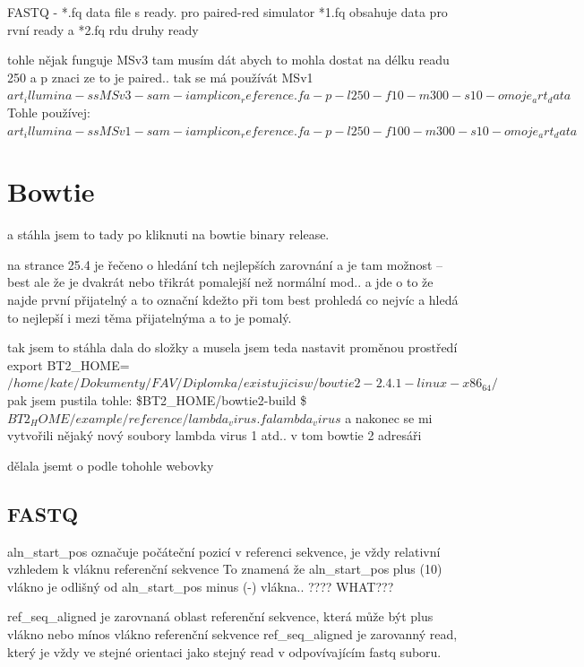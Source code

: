 \documentclass[czech,DP]{thesiskiv}
\numberwithin{equation}{section}
\begin{document}
FASTQ - *.fq data file s ready. pro paired-red simulator
*1.fq obsahuje data pro rvní ready a *2.fq rdu druhy ready

tohle nějak funguje
MSv3 tam musím dát abych to mohla dostat na délku readu 250 a p znaci ze to je paired.. 
tak se má používát MSv1
$art_illumina -ss MSv3 -sam -i amplicon_reference.fa -p -l 250 -f 10 -m 300 -s 10 -o moje_art_data$
Tohle používej:
$art_illumina -ss MSv1 -sam -i amplicon_reference.fa -p -l 250 -f 100 -m 300 -s 10 -o moje_art_data$


\section{Bowtie}
 a stáhla jsem to tady %
 po kliknuti na bowtie binary release.

na strance 25.4 je řečeno o hledání tch nejlepších zarovnání a je tam možnost --best ale že je dvakrát nebo třikrát pomalejší než normální mod.. a jde o to že najde první přijatelný a to označní kdežto při tom best prohledá co nejvíc a hledá to nejlepší i mezi těma přijatelnýma a to je pomalý.


tak jsem  to stáhla dala do složky a musela jsem teda nastavit proměnou prostředí 
export BT2\_HOME=$/home/kate/Dokumenty/FAV/Diplomka/existujicisw/bowtie2-2.4.1-linux-x86_64/$
pak jsem pustila tohle: 
\$BT2\_HOME/bowtie2-build \$ $BT2_HOME/example/reference/lambda_virus.fa lambda_virus$
a nakonec se mi vytvořili nějaký nový soubory lambda virus 1 atd.. v tom bowtie 2 adresáři

dělala jsemt o podle tohohle webovky %

\subsection{FASTQ}

	    
	    aln\_start\_pos označuje počáteční pozicí v referenci sekvence, je vždy relativní vzhledem k vláknu referenční sekvence
	    To znamená že aln\_start\_pos plus (10) vlákno je odlišný od  aln\_start\_pos minus (-) vlákna.. ???? WHAT???
	    
		ref\_seq\_aligned je zarovnaná oblast referenční sekvence, která může být plus vlákno nebo mínos vlákno referenční sekvence
		ref\_seq\_aligned je zarovanný read, který je vždy ve stejné orientaci jako stejný read v odpovívajícím fastq suboru.  
		
\end{document}
